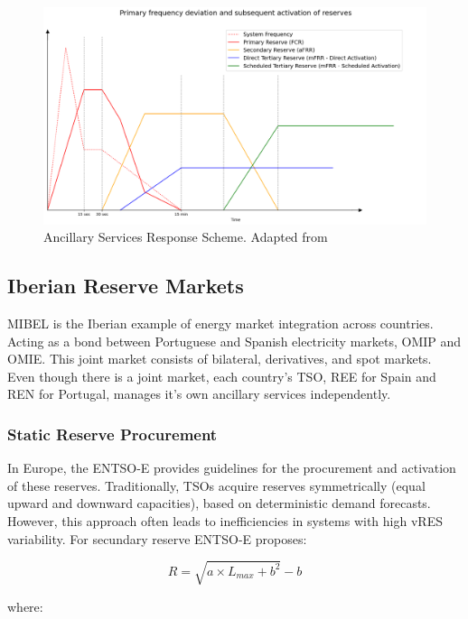 \begin{figure}[H]
  \centering
  \includegraphics[width=\textwidth]{plots/actiavtion_example_eng.png}
  \caption{Ancillary Services Response Scheme. Adapted from \cite{handbook2009policy}}
  \label{fig:Ancillary_Services_response_scheme}
\end{figure}
\unskip



\subsection{Iberian Reserve Markets}

\gls{MIBEL} is the Iberian example of energy market integration across countries. Acting as a bond between Portuguese and Spanish electricity markets, \gls{OMIP} and \gls{OMIE}. This joint market consists of bilateral, derivatives, and spot markets.
Even though there is a joint market, each country's \gls{TSO}, \gls{REE} for Spain and \gls{REN} for Portugal, manages it's own ancillary services independently. 

\subsubsection{Static Reserve Procurement}
In Europe, the \gls{ENTSO-E} provides guidelines for the procurement and activation of these reserves. Traditionally, \gls{TSO}s acquire reserves symmetrically (equal upward and downward capacities), based on deterministic demand forecasts. However, this approach often leads to inefficiencies in systems with high \gls{vRES} variability.
%
For secundary reserve \gls{ENTSO-E} proposes:
\begin{linenomath}
\begin{equation}\label{eq:BRENTSOE} 
    R = \sqrt{a \times  L_{max} + b^{2}} - b 
\end{equation}
\end{linenomath}
where:

